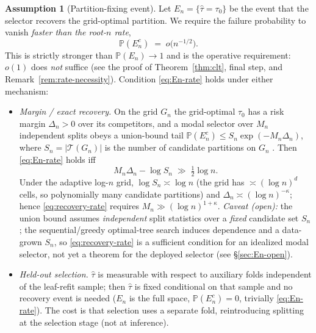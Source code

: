 \documentclass[11pt]{article}
\theoremstyle{plain}
\theoremstyle{definition}
\newtheorem{assumption}{Assumption}
\theoremstyle{remark}
\newcommand{\PP}{\mathbb{P}}
\newcommand{\odiff}{o}
\begin{document}
\begin{assumption}[Partition-fixing event]\label{ass:En}
Let $E_n=\{\hat\tau=\tau_0\}$ be the event that the selector recovers the
grid-optimal partition. We require the failure probability to vanish
\emph{faster than the root-$n$ rate},
\begin{equation}\label{eq:En-rate}
  \PP(E_n^c)\;=\;\odiff\!\bigl(n^{-1/2}\bigr).
\end{equation}
This is strictly stronger than $\PP(E_n)\to1$ and is the operative requirement:
$\odiff(1)$ does \emph{not} suffice (see the proof of Theorem~\ref{thm:clt}, final
step, and Remark~\ref{rem:rate-necessity}). Condition \eqref{eq:En-rate} holds
under either mechanism:
\begin{itemize}
  \item[(B)] \emph{Margin / exact recovery.} On the grid $G_n$ the grid-optimal
  $\tau_0$ has a risk margin $\Delta_n>0$ over its competitors, and a modal
  selector over $M_n$ independent splits obeys a union-bound tail
  $\PP(E_n^c)\le S_n\exp(-M_n\Delta_n)$, where $S_n=\lvert\mathcal{T}(G_n)\rvert$
  is the number of candidate partitions on $G_n$
  \citep[cf.][]{ChenSyrgkanisAustern2022}. Then \eqref{eq:En-rate} holds iff
  \begin{equation}\label{eq:recovery-rate}
    M_n\Delta_n-\log S_n\;\gg\;\tfrac12\log n.
  \end{equation}
  Under the adaptive log-$n$ grid, $\log S_n\asymp\log n$ (the grid has
  $\asymp(\log n)^{d}$ cells, so polynomially many candidate partitions) and
  $\Delta_n\asymp(\log n)^{-\kappa}$; hence \eqref{eq:recovery-rate} requires
  $M_n\gg(\log n)^{1+\kappa}$. \emph{Caveat (open):} the union bound assumes
  \emph{independent} split statistics over a \emph{fixed} candidate set $S_n$;
  the sequential/greedy optimal-tree search induces dependence and a data-grown
  $S_n$, so \eqref{eq:recovery-rate} is a sufficient condition for an idealized
  modal selector, not yet a theorem for the deployed selector
  (see \S\ref{sec:En-open}).
  \item[(A)] \emph{Held-out selection.} $\hat\tau$ is measurable with respect to
  auxiliary folds independent of the leaf-refit sample; then $\hat\tau$ is fixed
  conditional on that sample and no recovery event is needed
  ($E_n$ is the full space, $\PP(E_n^c)=0$, trivially \eqref{eq:En-rate}). The
  cost is that selection uses a separate fold, reintroducing splitting at the
  selection stage (not at inference).
\end{itemize}
\end{assumption}
\end{document}
